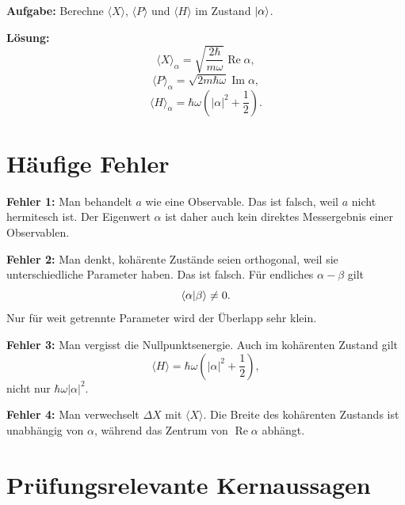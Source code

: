\begin{examplebox}
\textbf{Aufgabe:} Berechne \(\langle X\rangle\), \(\langle P\rangle\) und \(\langle H\rangle\) im Zustand \(\left|\alpha\right\rangle\).

\textbf{Lösung:}
\[
    \langle X\rangle_\alpha=\sqrt{\frac{2\hbar}{m\omega}}\operatorname{Re}\alpha,
\]
\[
    \langle P\rangle_\alpha=\sqrt{2m\hbar\omega}\operatorname{Im}\alpha,
\]
\[
    \langle H\rangle_\alpha=\hbar\omega\left(|\alpha|^2+\frac12\right).
\]
\end{examplebox}

\section{Häufige Fehler}

\begin{warningbox}
\textbf{Fehler 1:} Man behandelt \(a\) wie eine Observable. Das ist falsch, weil \(a\) nicht hermitesch ist. Der Eigenwert \(\alpha\) ist daher auch kein direktes Messergebnis einer Observablen.
\end{warningbox}

\begin{warningbox}
\textbf{Fehler 2:} Man denkt, kohärente Zustände seien orthogonal, weil sie unterschiedliche Parameter haben. Das ist falsch. Für endliches \(\alpha-\beta\) gilt
\[
    \left\langle\alpha\middle|\beta\right\rangle\neq 0.
\]
Nur für weit getrennte Parameter wird der Überlapp sehr klein.
\end{warningbox}

\begin{warningbox}
\textbf{Fehler 3:} Man vergisst die Nullpunktsenergie. Auch im kohärenten Zustand gilt
\[
    \langle H\rangle=\hbar\omega\left(|\alpha|^2+\frac12\right),
\]
nicht nur \(\hbar\omega|\alpha|^2\).
\end{warningbox}

\begin{warningbox}
\textbf{Fehler 4:} Man verwechselt \(\Delta X\) mit \(\langle X\rangle\). Die Breite des kohärenten Zustands ist unabhängig von \(\alpha\), während das Zentrum von \(\operatorname{Re}\alpha\) abhängt.
\end{warningbox}

\section{Prüfungsrelevante Kernaussagen}

